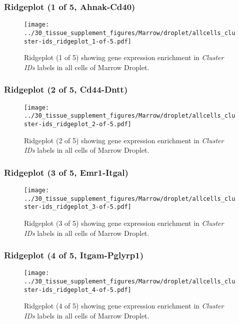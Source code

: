 \clearpage

\subsubsection{Ridgeplot (1 of 5, Ahnak-Cd40)}
\begin{figure}[h]
\centering
\texttt{[image: ../30\_tissue\_supplement\_figures/Marrow/droplet/allcells\_cluster-ids\_ridgeplot\_1-of-5.pdf]}

\caption{ Ridgeplot (1 of 5)  showing gene expression enrichment in \emph{Cluster IDs} labels in all cells of Marrow Droplet. }
\end{figure}


\clearpage

\subsubsection{Ridgeplot (2 of 5, Cd44-Dntt)}
\begin{figure}[h]
\centering
\texttt{[image: ../30\_tissue\_supplement\_figures/Marrow/droplet/allcells\_cluster-ids\_ridgeplot\_2-of-5.pdf]}

\caption{ Ridgeplot (2 of 5)  showing gene expression enrichment in \emph{Cluster IDs} labels in all cells of Marrow Droplet. }
\end{figure}


\clearpage

\subsubsection{Ridgeplot (3 of 5, Emr1-Itgal)}
\begin{figure}[h]
\centering
\texttt{[image: ../30\_tissue\_supplement\_figures/Marrow/droplet/allcells\_cluster-ids\_ridgeplot\_3-of-5.pdf]}

\caption{ Ridgeplot (3 of 5)  showing gene expression enrichment in \emph{Cluster IDs} labels in all cells of Marrow Droplet. }
\end{figure}


\clearpage

\subsubsection{Ridgeplot (4 of 5, Itgam-Pglyrp1)}
\begin{figure}[h]
\centering
\texttt{[image: ../30\_tissue\_supplement\_figures/Marrow/droplet/allcells\_cluster-ids\_ridgeplot\_4-of-5.pdf]}

\caption{ Ridgeplot (4 of 5)  showing gene expression enrichment in \emph{Cluster IDs} labels in all cells of Marrow Droplet. }
\end{figure}


